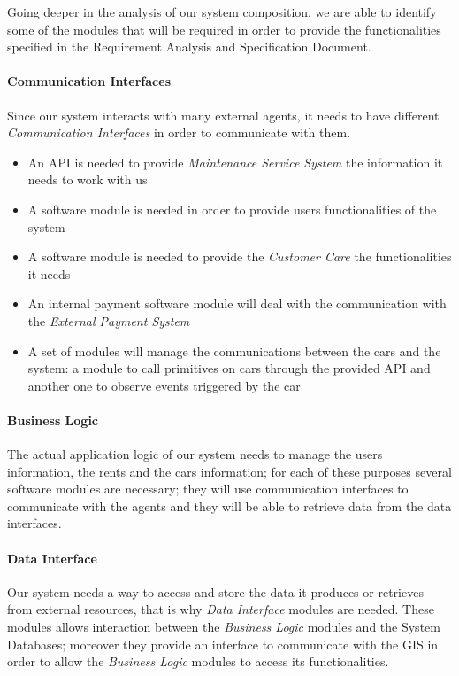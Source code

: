 		Going deeper in the analysis of our system composition, we are able to identify some of the modules that will be required in order to provide the functionalities specified in the Requirement Analysis and Specification Document. 
		\paragraph{Communication Interfaces}
			Since our system interacts with many external agents, it needs to have different \emph{Communication Interfaces} in order to communicate with them. 
		\begin{itemize}
			\item An API is needed to provide \emph{Maintenance Service System} the information it needs to work with us
			\item A software module is needed in order to provide users functionalities of the system 
			\item A software module is needed to provide the \emph{Customer Care} the functionalities it needs
			\item An internal payment software module will deal with the communication with the \emph{External Payment System} 
			\item A set of modules will manage the communications between the cars and the system: a module to call primitives on cars through the provided API and another one to observe events triggered by the car
		\end{itemize}
		\paragraph{Business Logic}
			The actual application logic of our system needs to manage the users information, the rents and the cars information; for each of these purposes several software modules are necessary; they will use communication interfaces to communicate with the agents and they will be able to retrieve data from the data interfaces.
		\paragraph{Data Interface}
			Our system needs a way to access and store the data it produces or retrieves from external resources, that is why \emph{Data Interface} modules are needed. These modules allows interaction between the \emph{Business Logic} modules and the System Databases; moreover they provide an interface to communicate with the GIS in order to allow the \emph{Business Logic} modules to access its functionalities.

